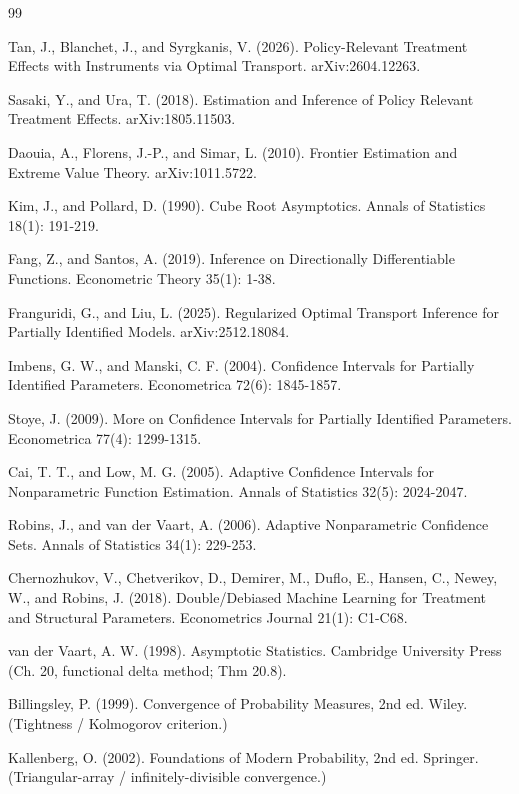 \documentclass{article}
\begin{document}
\begin{thebibliography}{99}

   Tan, J., Blanchet, J., and Syrgkanis, V. (2026). Policy-Relevant Treatment Effects with Instruments via Optimal Transport. arXiv:2604.12263.

   Sasaki, Y., and Ura, T. (2018). Estimation and Inference of Policy Relevant Treatment Effects. arXiv:1805.11503.

   Daouia, A., Florens, J.-P., and Simar, L. (2010). Frontier Estimation and Extreme Value Theory. arXiv:1011.5722.

   Kim, J., and Pollard, D. (1990). Cube Root Asymptotics. Annals of Statistics 18(1): 191-219.

   Fang, Z., and Santos, A. (2019). Inference on Directionally Differentiable Functions. Econometric Theory 35(1): 1-38.

   Franguridi, G., and Liu, L. (2025). Regularized Optimal Transport Inference for Partially Identified Models. arXiv:2512.18084.

   Imbens, G. W., and Manski, C. F. (2004). Confidence Intervals for Partially Identified Parameters. Econometrica 72(6): 1845-1857.

   Stoye, J. (2009). More on Confidence Intervals for Partially Identified Parameters. Econometrica 77(4): 1299-1315.

   Cai, T. T., and Low, M. G. (2005). Adaptive Confidence Intervals for Nonparametric Function Estimation. Annals of Statistics 32(5): 2024-2047.

   Robins, J., and van der Vaart, A. (2006). Adaptive Nonparametric Confidence Sets. Annals of Statistics 34(1): 229-253.

   Chernozhukov, V., Chetverikov, D., Demirer, M., Duflo, E., Hansen, C., Newey, W., and Robins, J. (2018). Double/Debiased Machine Learning for Treatment and Structural Parameters. Econometrics Journal 21(1): C1-C68.

   van der Vaart, A. W. (1998). Asymptotic Statistics. Cambridge University Press (Ch. 20, functional delta method; Thm 20.8).

   Billingsley, P. (1999). Convergence of Probability Measures, 2nd ed. Wiley. (Tightness / Kolmogorov criterion.)

   Kallenberg, O. (2002). Foundations of Modern Probability, 2nd ed. Springer. (Triangular-array / infinitely-divisible convergence.)

\end{thebibliography}
\end{document}
